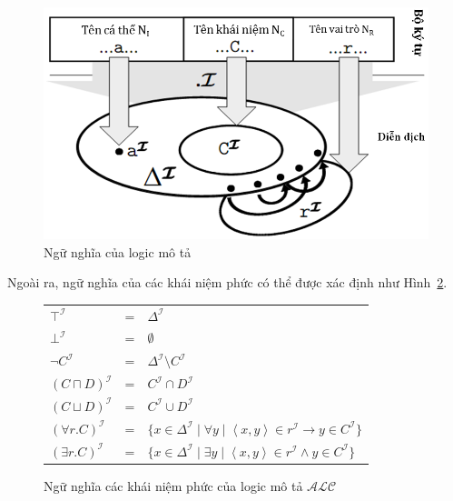 \documentclass[12pt,a4paper]{report}
\newcommand{\mand}{\sqcap}
\newcommand{\mor}{\sqcup}
\newcommand{\V}{\forall}
\newcommand{\E}{\exists}
\newcommand{\ALC}{$\mathcal{ALC}$}
\newcommand{\mI}{\mathcal{I}}
\def\tuple#1{\left\langle#1\right\rangle}
\begin{document}
\begin{figure}[h]
  \begin{center}
    \includegraphics[scale=0.4]{NguNghia.png}
    \caption{Ngữ nghĩa của logic mô tả}\label{fig:Semantic}
  \end{center}
  
\end{figure}

Ngoài ra, ngữ nghĩa của các khái niệm phức có thể được xác định như Hình~\ref{fig:SemanticALC}.

\begin{figure}
  \begin{center}
    \begin{tabular}{|l c l|}
      \hline
      $\top^\mI$ &\!\!\!\!=\!\!\!\!& $\Delta^\mI$\\
      $\bot^\mI$ &\!\!\!\!=\!\!\!\!& $\emptyset$\\
      $\neg C^\mI$ &\!\!\!\!=\!\!\!\!& $\Delta^\mI \setminus C^\mI$\\
      $(C \mand D)^\mI$ &\!\!\!\!=\!\!\!\!& $C^\mI \cap D^\mI$\\
      $(C \mor D)^\mI$ &\!\!\!\!=\!\!\!\!& $C^\mI \cup D^\mI$\\
      $(\V r.C)^\mI$ &\!\!\!\!=\!\!\!\!& $\{x \in \Delta^\mI \mid \V y \mid \tuple{x, y} \in r^\mI \rightarrow y\in C^\mI\}$\\
      $(\E r.C)^\mI$ &\!\!\!\!=\!\!\!\!& $\{x \in \Delta^\mI \mid \E y \mid \tuple{x, y} \in r^\mI \wedge y\in C^\mI\}$\\
    
    \hline
    \end{tabular}
    \caption{Ngữ nghĩa các khái niệm phức của logic mô tả \ALC}\label{fig:SemanticALC}
  \end{center}
  
\end{figure}
\end{document}
